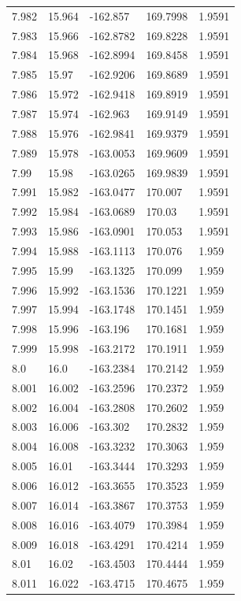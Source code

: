 \begin{tabular}{lllll}
7.982 & 15.964 & -162.857 & 169.7998 & 1.9591 \\
7.983 & 15.966 & -162.8782 & 169.8228 & 1.9591 \\
7.984 & 15.968 & -162.8994 & 169.8458 & 1.9591 \\
7.985 & 15.97 & -162.9206 & 169.8689 & 1.9591 \\
7.986 & 15.972 & -162.9418 & 169.8919 & 1.9591 \\
7.987 & 15.974 & -162.963 & 169.9149 & 1.9591 \\
7.988 & 15.976 & -162.9841 & 169.9379 & 1.9591 \\
7.989 & 15.978 & -163.0053 & 169.9609 & 1.9591 \\
7.99 & 15.98 & -163.0265 & 169.9839 & 1.9591 \\
7.991 & 15.982 & -163.0477 & 170.007 & 1.9591 \\
7.992 & 15.984 & -163.0689 & 170.03 & 1.9591 \\
7.993 & 15.986 & -163.0901 & 170.053 & 1.9591 \\
7.994 & 15.988 & -163.1113 & 170.076 & 1.959 \\
7.995 & 15.99 & -163.1325 & 170.099 & 1.959 \\
7.996 & 15.992 & -163.1536 & 170.1221 & 1.959 \\
7.997 & 15.994 & -163.1748 & 170.1451 & 1.959 \\
7.998 & 15.996 & -163.196 & 170.1681 & 1.959 \\
7.999 & 15.998 & -163.2172 & 170.1911 & 1.959 \\
8.0 & 16.0 & -163.2384 & 170.2142 & 1.959 \\
8.001 & 16.002 & -163.2596 & 170.2372 & 1.959 \\
8.002 & 16.004 & -163.2808 & 170.2602 & 1.959 \\
8.003 & 16.006 & -163.302 & 170.2832 & 1.959 \\
8.004 & 16.008 & -163.3232 & 170.3063 & 1.959 \\
8.005 & 16.01 & -163.3444 & 170.3293 & 1.959 \\
8.006 & 16.012 & -163.3655 & 170.3523 & 1.959 \\
8.007 & 16.014 & -163.3867 & 170.3753 & 1.959 \\
8.008 & 16.016 & -163.4079 & 170.3984 & 1.959 \\
8.009 & 16.018 & -163.4291 & 170.4214 & 1.959 \\
8.01 & 16.02 & -163.4503 & 170.4444 & 1.959 \\
8.011 & 16.022 & -163.4715 & 170.4675 & 1.959 \\

\end{tabular}
